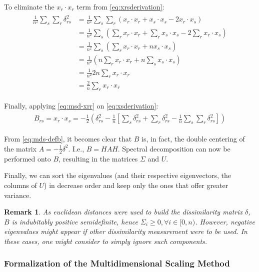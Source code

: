 \documentclass[12pt]{article}
\newtheorem{remark}{Remark}[section]
\begin{document}
To eliminate the $x_r\cdot x_r$ term from \ref{eq:xrsderivation}:
\begin{align}
\label{eq:msd-xrr}
\begin{split}
\frac{1}{n^2} \sum_s\sum_r\delta_{rs}^2 &= \frac{1}{n^2} \sum_s\sum_r(x_r\cdot x_r + x_s\cdot x_s -2x_r\cdot x_s)\\
&= \frac{1}{n^2}\sum_s(\sum_r x_r\cdot x_r + \sum_r x_s\cdot x_s -2\sum_r x_r\cdot x_s)\\
&= \frac{1}{n^2}\sum_s(\sum_r x_r\cdot x_r + n x_s\cdot x_s) \\
&= \frac{1}{n^2}(n \sum_r x_r\cdot x_r + n \sum_s x_s \cdot x_s) \\
&= \frac{1}{n^2} 2n \sum_r x_r\cdot x_r \\
&= \frac{2}{n} \sum_r x_r\cdot x_r
\end{split}
\end{align}

Finally, applying \ref{eq:msd-xrr} on \ref{eq:xsderivation}:
\begin{align}
\label{eq:mds-defb}
\begin{split}
B_{rs} = x_r\cdot x_s = -\frac{1}{2} (\delta_{rs}^2 - \frac{1}{n} [\sum_s \delta_{rs}^2 + \sum_r \delta_{rs}^2 - \frac{1}{n}\sum_s \sum_r \delta_{rs}^2])
\end{split}
\end{align}

From \ref{eq:mds-defb}, it becomes clear that $B$ is, in fact, the double centering of the matrix $A=-\frac{1}{2}\delta^2$. I.e., $B=HAH$. Spectral decomposition can now be performed onto $B$, resulting in the matrices $\Sigma$ and $U$.

Finally, we can sort the eigenvalues (and their respective eigenvectors, the columns of $U$) in decrease order and keep only the ones that offer greater variance.

\begin{remark}
	As euclidean distances were used to build the dissimilarity matrix $\delta$, $B$ is indubitably positive semidefinite, hence $\Sigma_i \ge 0, \forall i\in [0, n)$. However, negative eigenvalues might appear if other dissimilarity measurement were to be used. In these cases, one might consider to simply ignore such components.
\end{remark}

\subsubsection{Formalization of the Multidimensional Scaling Method}
\end{document}
